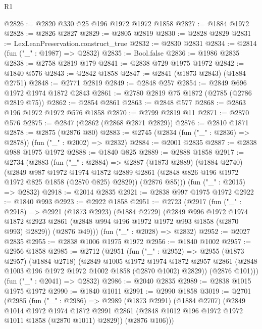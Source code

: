 \begin{lexlean}{R1}
\begin{coremodule}
@2826 := @2820 @330 @25 @196 @1972 @1972 @1858
@2827 := @1884 @1972
@2828 := @2826 @2827
@2829 := @2805 @2819
@2830 := @2828 @2829
@2831 := LexLeanPreservation.construct_true
@2832 := @2830 @2831
@2834 := @2814 (fun ("_" : @1987) => @2832)
@2835 := Bool.false
@2836 := @1986 @2835
@2838 := @2758 @2819 @179
@2841 := @2838 @729 @1975 @1972
@2842 := @1840 @576
@2843 := @2842 @1858
@2847 := @2841 (@1873 @2843) (@1884 @2751)
@2848 := @2771 @2819
@2849 := @2848 @257
@2854 := @2849 @696 @1972 @1974 @1872 @2843
@2861 := @2780 @2819 @75 @1872 (@2785 (@2786 @2819 @75))
@2862 := @2854 @2861
@2863 := @2848 @577
@2868 := @2863 @196 @1972 @1972 @576 @1858
@2870 := @2799 @2819 @11
@2871 := @2870 @576
@2875 := @2847 (@2862 (@2868 @2871 @2829))
@2876 := @2810 @1871
@2878 := @2875 (@2876 @80)
@2883 := @2745 (@2834 (fun ("_" : @2836) => @2878)) (fun ("_" : @2002) => @2832)
@2884 := @2001 @2835
@2887 := @2838 @988 @1975 @1972
@2888 := @1840 @825
@2889 := @2888 @1858
@2917 := @2734
    (@2883
      (fun ("_" : @2884) =>
      @2887
        (@1873 @2889)
        (@1884 @2740)
        (@2849
          @987
          @1972
          @1974
          @1872
          @2889
          @2861
          (@2848 @826 @196 @1972 @1972 @825 @1858 (@2870 @825) @2829))
        (@2876 @85)))
    (fun ("_" : @2015) => @2832)
@2918 := @2014 @2835
@2921 := @2838 @997 @1975 @1972
@2922 := @1840 @993
@2923 := @2922 @1858
@2951 := @2723
    (@2917
      (fun ("_" : @2918) =>
      @2921
        (@1873 @2923)
        (@1884 @2729)
        (@2849
          @996
          @1972
          @1974
          @1872
          @2923
          @2861
          (@2848 @994 @196 @1972 @1972 @993 @1858 (@2870 @993) @2829))
        (@2876 @49)))
    (fun ("_" : @2028) => @2832)
@2952 := @2027 @2835
@2955 := @2838 @1006 @1975 @1972
@2956 := @1840 @1002
@2957 := @2956 @1858
@2985 := @2712
    (@2951
      (fun ("_" : @2952) =>
      @2955
        (@1873 @2957)
        (@1884 @2718)
        (@2849
          @1005
          @1972
          @1974
          @1872
          @2957
          @2861
          (@2848 @1003 @196 @1972 @1972 @1002 @1858 (@2870 @1002) @2829))
        (@2876 @101)))
    (fun ("_" : @2041) => @2832)
@2986 := @2040 @2835
@2989 := @2838 @1015 @1975 @1972
@2990 := @1840 @1011
@2991 := @2990 @1858
@3019 := @2701
    (@2985
      (fun ("_" : @2986) =>
      @2989
        (@1873 @2991)
        (@1884 @2707)
        (@2849
          @1014
          @1972
          @1974
          @1872
          @2991
          @2861
          (@2848 @1012 @196 @1972 @1972 @1011 @1858 (@2870 @1011) @2829))
        (@2876 @106)))

\end{coremodule}
\end{lexlean}
